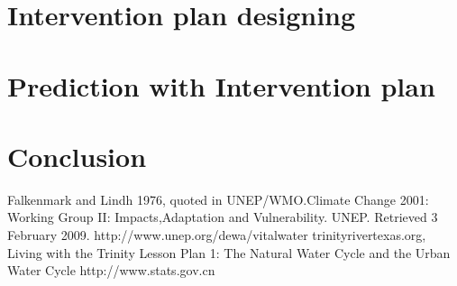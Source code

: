 \section{Intervention plan designing}

\section{Prediction with Intervention plan}

\section{Conclusion}


\begin{thebibliography}{99}
   {Falkenmark and Lindh 1976, quoted in UNEP/WMO.Climate Change 2001: Working Group II: Impacts,Adaptation and Vulnerability. UNEP. Retrieved 3 February 2009.}
   http://www.unep.org/dewa/vitalwater
   trinityrivertexas.org, Living with the Trinity Lesson Plan 1: The Natural Water Cycle and the Urban Water Cycle
   http://www.stats.gov.cn
\end{thebibliography}

